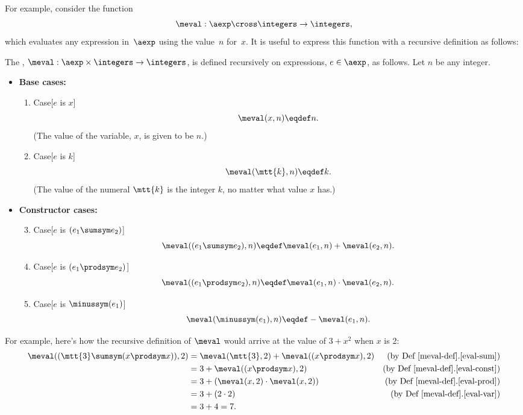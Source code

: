 For example, consider the function
\begin{equation*}
    \meval: \aexp \cross \integers \to \integers,
\end{equation*}
which evaluates any expression in~$\aexp$ using the value~$n$
for~$x$.  It is useful to express this function with a recursive
definition as follows:
\begin{definition}\label{meval-def}
  The , $\meval: \aexp \times \integers \to
  \integers$, is defined recursively on expressions, $e \in \aexp$, as
  follows.  Let $n$ be any integer.

\begin{itemize}
\item \textbf{Base cases:}

\begin{enumerate}

\item\label{eval-var} Case[$e$ is $x$]
\[
\meval(x, n) \eqdef n.
\]
(The value of the variable, $x$, is given to be $n$.)

\item\label{eval-const} Case[$e$ is $k$]
\[
\meval(\mtt{k}, n) \eqdef k.
\]
(The value of the numeral $\mtt{k}$ is the integer $k$, no matter what
value $x$ has.)

\end{enumerate}

\item \textbf{Constructor cases:}

\begin{enumerate}
\setcounter{enumi}{2}

\item\label{eval-sum} Case[$e$ is $(e_1 \sumsym e_2)$]
\[
\meval((e_1 \sumsym e_2),n) \eqdef
  \meval(e_1,n)+\meval(e_2,n).
\]

\item\label{eval-prod} Case[$e$ is $(e_1 \prodsym e_2)$]
\[
\meval((e_1 \prodsym e_2),n) \eqdef \meval(e_1,n) \cdot \meval(e_2,n).
\]

\item\label{eval-minus} Case[$e$ is $\minussym(e_1)$]
\[
\meval(\minussym(e_1),n) \eqdef - \meval(e_1,n).
\]
\end{enumerate}

\end{itemize}

\end{definition}

For example, here's how the recursive definition of $\meval$ would arrive at
the value of $3+x^2$ when $x$ is 2:
\begin{align*}
\meval((\mtt{3} \sumsym (x \prodsym x)),2)
 & = \meval(\mtt{3},2) + \meval((x \prodsym x),2)
                  & \text{(by~Def~\ref{meval-def}.\ref{eval-sum})}\\
 & = 3 + \meval((x \prodsym x),2) & \text{(by~Def~\ref{meval-def}.\ref{eval-const})}\\
 & = 3 + (\meval(x,2) \cdot \meval(x,2)) & \text{(by~Def~\ref{meval-def}.\ref{eval-prod})}\\
 & = 3 + (2 \cdot 2) & \text{(by~Def~\ref{meval-def}.\ref{eval-var})}\\
 & = 3 + 4 = 7.
\end{align*}

